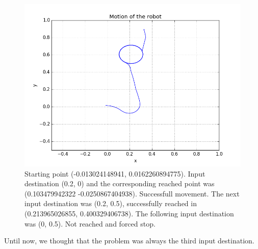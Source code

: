 \documentclass[a4paper,11pt,oneside]{book}
\begin{document}
\begin{figure}[H]
\begin{center}
\includegraphics[width=1\textwidth]{figs/experiments/4_1}
\caption[Experiment: Destination (0.2, 0), (0.2, 0.5), (0, 0.5)]{Starting point (-0.013024148941, 0.0162260894775). Input destination (0.2, 0) and the corresponding reached point was (0.103479942322 -0.0250867404938). Successfull movement. The next input destination was (0.2, 0.5), successfully reached in (0.213965026855, 0.400329406738). The following input destination was (0, 0.5). Not reached and forced stop.}
\end{center}
\end{figure}

Until now, we thought that the problem was always the third input destination.
\end{document}
